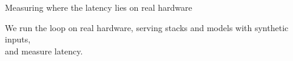 \documentclass[11pt,aspectratio=169]{beamer}
\begin{document}
\begin{frame}{Measuring where the latency lies on real hardware}
\begin{center}
{}
\end{center}

\vspace{0.05cm}
{\centering\small We run the loop on real hardware, serving stacks and models with synthetic inputs,\\ and measure latency.\par}

\end{frame}

\end{document}
